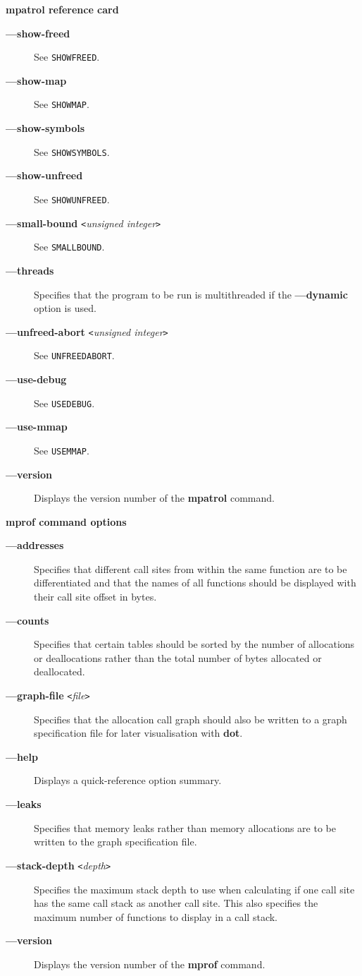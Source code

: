 \documentclass[a4paper,landscape,final]{article}
\newcommand{\heading}[1]{\textbf{\normalsize #1}}
\newcommand{\command}[1]{\textbf{#1}}
\newcommand{\flag}[1]{\textbf{---#1}}
\newcommand{\flagpar}[2]{\flag{#1} \texttt{<}\textit{#2}\texttt{>}}
\newcommand{\option}[1]{\texttt{#1}}
\begin{document}
\begin{multicols}{3}{\textbf{\Large mpatrol reference card}}
\begin{description}
\item[\flag{show-freed}]
\hfill See \option{SHOWFREED}.
\item[\flag{show-map}]
\hfill See \option{SHOWMAP}.
\item[\flag{show-symbols}]
\hfill See \option{SHOWSYMBOLS}.
\item[\flag{show-unfreed}]
\hfill See \option{SHOWUNFREED}.
\item[\flagpar{small-bound}{unsigned integer}]
\hfill See \option{SMALLBOUND}.
\item[\flag{threads}]
Specifies that the program to be run is multithreaded if the \flag{dynamic}
option is used.
\item[\flagpar{unfreed-abort}{unsigned integer}]
\hfill See \option{UNFREEDABORT}.
\item[\flag{use-debug}]
\hfill See \option{USEDEBUG}.
\item[\flag{use-mmap}]
\hfill See \option{USEMMAP}.
\item[\flag{version}]
Displays the version number of the \command{mpatrol} command.
\end{description}

\vskip 12pt
\heading{mprof command options}
\vskip 6pt

\begin{description}
\item[\flag{addresses}]
Specifies that different call sites from within the same function are to be
differentiated and that the names of all functions should be displayed with
their call site offset in bytes.
\item[\flag{counts}]
Specifies that certain tables should be sorted by the number of allocations or
deallocations rather than the total number of bytes allocated or deallocated.
\item[\flagpar{graph-file}{file}]
Specifies that the allocation call graph should also be written to a graph
specification file for later visualisation with \command{dot}.
\item[\flag{help}]
Displays a quick-reference option summary.
\item[\flag{leaks}]
Specifies that memory leaks rather than memory allocations are to be written to
the graph specification file.
\item[\flagpar{stack-depth}{depth}]
Specifies the maximum stack depth to use when calculating if one call site has
the same call stack as another call site.  This also specifies the maximum
number of functions to display in a call stack.
\item[\flag{version}]
Displays the version number of the \command{mprof} command.
\end{description}


\end{multicols}
\end{document}
